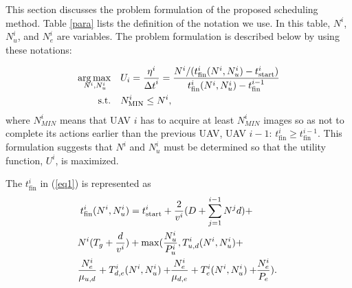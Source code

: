 \documentclass{ieeeaccess}
\begin{document}
This section discusses the problem formulation of the proposed scheduling method.
%
Table \ref{para} lists the definition of the notation we use.
%
In this table, $N^i$, $N_u^i$, and $N_e^i$ are variables.
%
The problem formulation is described below by using these notations:

\begin{align}
\arg \max_{\hspace{-5mm}N^i,N_u^i} \quad&  U_i =\frac{\eta^{i}}{{\Delta{t}}^i}  = \frac{N^i / (t_{\mathrm{fin}}^i(N^i,N_u^i)-t_{\mathrm{start}}^i)}{t_{\mathrm{fin}}^i(N^i,N_u^i)-t_{\mathrm{fin}}^{i-1}}\label{eq1} \\
{\mathrm {s.t.}} \quad& {N_\mathrm {MIN}^i}\leq{N^i}, \label{eq2}
\end{align}
where $N_{MIN}^i$ means that UAV $i$ has to acquire at least $N_{MIN}^i$ images so as not to complete its actions earlier than the previous UAV, UAV $i-1$: ${t_{\mathrm{fin}}^i}\geq{t_{\mathrm{fin}}^{i-1}}$.
This formulation suggests that $N^i$ and $N_u^i$ must be determined so that the utility function, $U^i$, is maximized.

The $t_{\mathrm{fin}}^i$ in (\ref{eq1}) is represented as
\begin{align}
&t_{\mathrm{fin}}^i(N^i,N_u^i)=t_{\mathrm{start}}^i+\frac{2}{v^i}(D+\sum_{j=1}^{i-1}{N^{j}d})+\nonumber\\
&\hspace{-1mm}N^i({T_g+\frac{d}{v^i}})+\max(\frac{N_u^i}{P_u^i},T_{u,d}^{i}(N^i,N_u^i)+\nonumber\\
&\hspace{-1mm}\frac{N_e^i}{\mu_{u,d}}+T_{d,e}^{i}(N^i,N_u^i)+\hspace{-1mm}\frac{N_e^i}{\mu_{d,e}}+T_{e}^{i}(N^i,N_u^i)+\hspace{-1mm}\frac{N_e^i}{P_e}). \label{eq_fin}
\end{align}
\end{document}
